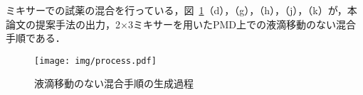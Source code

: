 ミキサーでの試薬の混合を行っている，図~\ref{fig:process}（d），（g），（h），（j），（k）が，本論文の提案手法の出力，2$\times$3ミキサーを用いたPMD上での液滴移動のない混合手順である．
\begin{figure}[tbp]
 \centering\texttt{[image: img/process.pdf]}
 \caption{液滴移動のない混合手順の生成過程}\label{fig:process}
\end{figure}






